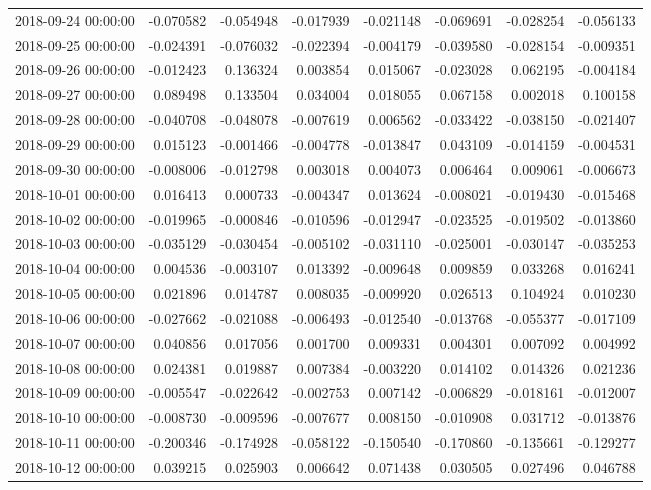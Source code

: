 \begin{tabular}{lrrrrrrr}
2018-09-24 00:00:00 & -0.070582 & -0.054948 & -0.017939 & -0.021148 & -0.069691 & -0.028254 & -0.056133 \\
2018-09-25 00:00:00 & -0.024391 & -0.076032 & -0.022394 & -0.004179 & -0.039580 & -0.028154 & -0.009351 \\
2018-09-26 00:00:00 & -0.012423 & 0.136324 & 0.003854 & 0.015067 & -0.023028 & 0.062195 & -0.004184 \\
2018-09-27 00:00:00 & 0.089498 & 0.133504 & 0.034004 & 0.018055 & 0.067158 & 0.002018 & 0.100158 \\
2018-09-28 00:00:00 & -0.040708 & -0.048078 & -0.007619 & 0.006562 & -0.033422 & -0.038150 & -0.021407 \\
2018-09-29 00:00:00 & 0.015123 & -0.001466 & -0.004778 & -0.013847 & 0.043109 & -0.014159 & -0.004531 \\
2018-09-30 00:00:00 & -0.008006 & -0.012798 & 0.003018 & 0.004073 & 0.006464 & 0.009061 & -0.006673 \\
2018-10-01 00:00:00 & 0.016413 & 0.000733 & -0.004347 & 0.013624 & -0.008021 & -0.019430 & -0.015468 \\
2018-10-02 00:00:00 & -0.019965 & -0.000846 & -0.010596 & -0.012947 & -0.023525 & -0.019502 & -0.013860 \\
2018-10-03 00:00:00 & -0.035129 & -0.030454 & -0.005102 & -0.031110 & -0.025001 & -0.030147 & -0.035253 \\
2018-10-04 00:00:00 & 0.004536 & -0.003107 & 0.013392 & -0.009648 & 0.009859 & 0.033268 & 0.016241 \\
2018-10-05 00:00:00 & 0.021896 & 0.014787 & 0.008035 & -0.009920 & 0.026513 & 0.104924 & 0.010230 \\
2018-10-06 00:00:00 & -0.027662 & -0.021088 & -0.006493 & -0.012540 & -0.013768 & -0.055377 & -0.017109 \\
2018-10-07 00:00:00 & 0.040856 & 0.017056 & 0.001700 & 0.009331 & 0.004301 & 0.007092 & 0.004992 \\
2018-10-08 00:00:00 & 0.024381 & 0.019887 & 0.007384 & -0.003220 & 0.014102 & 0.014326 & 0.021236 \\
2018-10-09 00:00:00 & -0.005547 & -0.022642 & -0.002753 & 0.007142 & -0.006829 & -0.018161 & -0.012007 \\
2018-10-10 00:00:00 & -0.008730 & -0.009596 & -0.007677 & 0.008150 & -0.010908 & 0.031712 & -0.013876 \\
2018-10-11 00:00:00 & -0.200346 & -0.174928 & -0.058122 & -0.150540 & -0.170860 & -0.135661 & -0.129277 \\
2018-10-12 00:00:00 & 0.039215 & 0.025903 & 0.006642 & 0.071438 & 0.030505 & 0.027496 & 0.046788 \\

\end{tabular}
